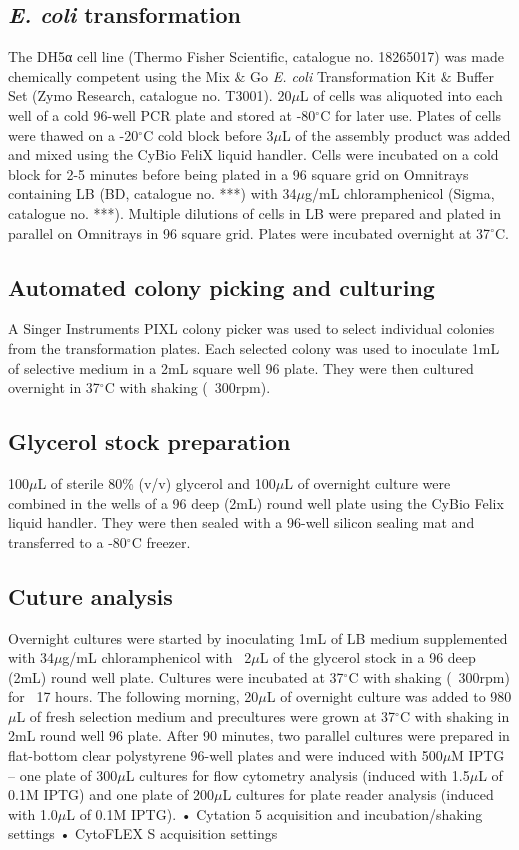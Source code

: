 \subsection{\textit{E. coli} transformation}
The DH5α cell line (Thermo Fisher Scientific, catalogue no. 18265017) was made chemically competent using the Mix $\&$ Go \textit{E. coli} Transformation Kit $\&$ Buffer Set (Zymo Research, catalogue no. T3001). 20$\mu$L of cells was aliquoted into each well of a cold 96-well PCR plate and stored at -80$^{\circ}$C for later use. Plates of cells were thawed on a -20$^{\circ}$C cold block before 3$\mu$L of the assembly product was added and mixed using the CyBio FeliX liquid handler. Cells were incubated on a cold block for 2-5 minutes before being plated in a 96 square grid on Omnitrays containing LB (BD, catalogue no. ***) with 34$\mu$g/mL chloramphenicol (Sigma, catalogue no. ***). Multiple dilutions of cells in LB were prepared and plated in parallel on Omnitrays in 96 square grid. Plates were incubated overnight at 37$^{\circ}$C.

\subsection{Automated colony picking and culturing}
A Singer Instruments PIXL colony picker was used to select individual colonies from the transformation plates. Each selected colony was used to inoculate 1mL of selective medium in a 2mL square well 96 plate. They were then cultured overnight in 37$^{\circ}$C with shaking (~300rpm).

\subsection{Glycerol stock preparation}
100$\mu$L of sterile 80\% (v/v) glycerol and 100$\mu$L of overnight culture were combined in the wells of a 96 deep (2mL) round well plate using the CyBio Felix liquid handler. They were then sealed with a 96-well silicon sealing mat and transferred to a -80$^{\circ}$C freezer. 

\subsection{Cuture analysis}
Overnight cultures were started by inoculating 1mL of LB medium supplemented with 34$\mu$g/mL chloramphenicol with ~2$\mu$L of the glycerol stock in a 96 deep (2mL) round well plate. Cultures were incubated at 37$^{\circ}$C with shaking (~300rpm) for ~17 hours. The following morning, 20$\mu$L of overnight culture was added to 980$\mu$L of fresh selection medium and precultures were grown at 37$^{\circ}$C with shaking in 2mL round well 96 plate. 
After 90 minutes, two parallel cultures were prepared in flat-bottom clear polystyrene 96-well plates and were induced with 500$\mu$M IPTG – one plate of 300$\mu$L cultures for flow cytometry analysis (induced with 1.5$\mu$L of 0.1M IPTG) and one plate of 200$\mu$L cultures for plate reader analysis (induced with 1.0$\mu$L of 0.1M IPTG).
•	Cytation 5 acquisition and incubation/shaking settings
•	CytoFLEX S acquisition settings


